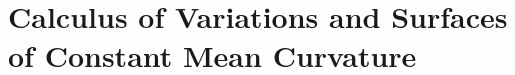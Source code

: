 \documentclass[Shifrin_Solutions_Spring_2015]{subfiles}
\begin{document}
\section{Calculus of Variations and Surfaces of Constant Mean Curvature}

\begin{exercise}

\end{exercise}

\begin{exercise}

\end{exercise}

\begin{exercise}

\end{exercise}


\begin{exercise}

\end{exercise}


\begin{exercise}

\end{exercise}


\begin{exercise}

\end{exercise}


\begin{exercise}

\end{exercise}


\begin{exercise}

\end{exercise}


\begin{exercise}

\end{exercise}
\end{document}
